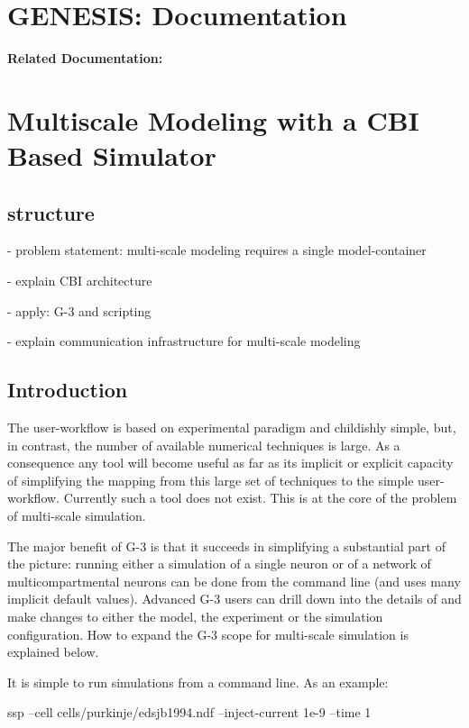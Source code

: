 \documentclass[12pt]{article}
\begin{document}
\section*{GENESIS: Documentation}

{\bf Related Documentation:}

\section*{Multiscale Modeling with a CBI Based Simulator}

\subsection*{structure}

- problem statement: multi-scale modeling requires a single model-container

- explain CBI architecture

- apply: G-3 and scripting

- explain communication infrastructure for multi-scale modeling


\subsection*{Introduction}

The user-workflow is based on experimental paradigm and childishly
simple, but, in contrast, the number of available numerical techniques
is large.  As a consequence any tool will become useful as far as its
implicit or explicit capacity of simplifying the mapping from this
large set of techniques to the simple user-workflow.  Currently such a
tool does not exist.  This is at the core of the problem of
multi-scale simulation.

The major benefit of G-3 is that it succeeds in simplifying a
substantial part of the picture: running either a simulation of a
single neuron or of a network of multicompartmental neurons can be
done from the command line (and uses many implicit default values).
Advanced G-3 users can drill down into the details of and make changes
to either the model, the experiment or the simulation configuration.
How to expand the G-3 scope for multi-scale simulation is explained
below.

It is simple to run simulations from a command line.  As an example:

ssp --cell cells/purkinje/edsjb1994.ndf --inject-current 1e-9 --time 1
\end{document}
